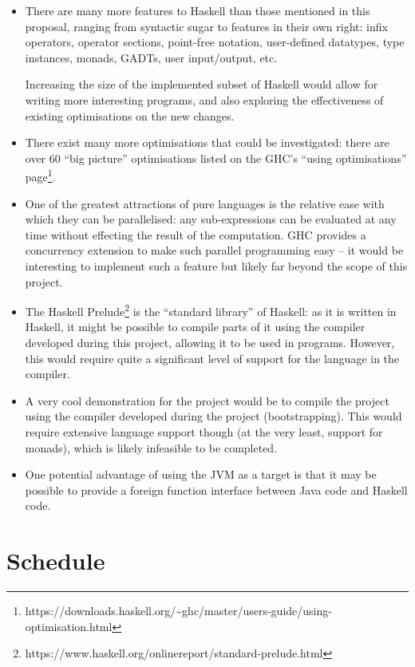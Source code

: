 \documentclass[12pt]{article}
\begin{document}
\begin{itemize}
\item
{
    There are many more features to Haskell than those mentioned in this proposal, ranging from syntactic sugar to
    features in their own right: infix operators, operator sections, point-free notation, user-defined datatypes, type
    instances, monads, GADTs, user input/output, etc.

    Increasing the size of the implemented subset of Haskell would allow for writing more interesting programs, and also
    exploring the effectiveness of existing optimisations on the new changes.
}
\item
{
    There exist many more optimisations that could be investigated: there are over 60 ``big picture'' optimisations
    listed on the GHC's ``using optimisations''
    page\footnote{https://downloads.haskell.org/\~{}ghc/master/users-guide/using-optimisation.html}.
}
\item
{
    One of the greatest attractions of pure languages is the relative ease with which they can be parallelised: any
    sub-expressions can be evaluated at any time without effecting the result of the computation. GHC provides a
    concurrency extension to make such parallel programming easy -- it would be interesting to implement such a feature
    but likely far beyond the scope of this project.
}
\item
{
    The Haskell Prelude\footnote{https://www.haskell.org/onlinereport/standard-prelude.html} is the ``standard library''
    of Haskell: as it is written in Haskell, it might be possible to compile parts of it using the compiler developed
    during this project, allowing it to be used in programs. However, this would require quite a significant level of
    support for the language in the compiler.
}
\item
{
    A very cool demonstration for the project would be to compile the project using the compiler developed during the
    project (bootstrapping). This would require extensive language support though (at the very least, support for
    monads), which is likely infeasible to be completed.
}
\item
{
    One potential advantage of using the JVM as a target is that it may be possible to provide a foreign function
    interface between Java code and Haskell code.
}
\end{itemize}

\section*{Schedule}
\end{document}

